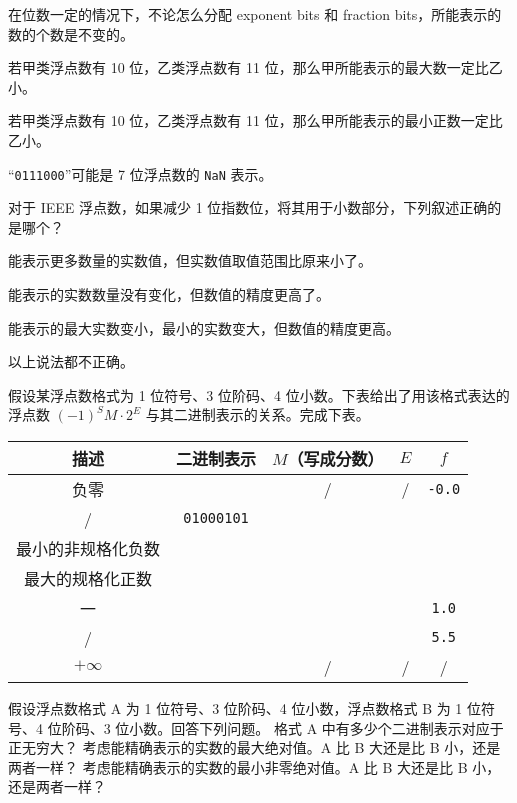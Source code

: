 \begin{problems}
		\begin{choices}
			\item 在位数一定的情况下，不论怎么分配 exponent bits 和 fraction bits，所能表示的数的个数是不变的。
			\item 若甲类浮点数有 10 位，乙类浮点数有 11 位，那么甲所能表示的最大数一定比乙小。
			\item 若甲类浮点数有 10 位，乙类浮点数有 11 位，那么甲所能表示的最小正数一定比乙小。
		    \item “\texttt{0111000}”可能是 7 位浮点数的 \texttt{NaN} 表示。
		\end{choices}
        \pro 对于 IEEE 浮点数，如果减少 1 位指数位，将其用于小数部分，下列叙述正确的是哪个？
		\begin{choices}
			\item 能表示更多数量的实数值，但实数值取值范围比原来小了。
			\item 能表示的实数数量没有变化，但数值的精度更高了。
			\item 能表示的最大实数变小，最小的实数变大，但数值的精度更高。
			\item 以上说法都不正确。
        \end{choices}
		\pro 假设某浮点数格式为 1 位符号、3 位阶码、4 位小数。下表给出了用该格式表达的浮点数 $(-1)^SM \cdot 2^E$ 与其二进制表示的关系。完成下表。
		\begin{table}[H]
			\centering
			\begin{tabular}{|c|c|c|c|c|}
				\hline
				描述 & 二进制表示 & $M$（写成分数） & $E$ & $f$ \\ \hline
				负零 &  & / & / & \texttt{-0.0} \\ \hline
				/ & \verb|01000101| &  &  &  \\ \hline
				最小的非规格化负数 &  &  &  &  \\ \hline
				最大的规格化正数 &  &  &  &  \\ \hline
				一 &  &  &  & \texttt{1.0} \\ \hline
				/ &  &  &  & \texttt{5.5} \\ \hline
				$+\infty$ &  & / & / & / \\ \hline
			\end{tabular}
		\end{table}
		\pro 假设浮点数格式 A 为 1 位符号、3 位阶码、4 位小数，浮点数格式 B 为 1 位符号、4 位阶码、3 位小数。回答下列问题。
			\qn 格式 A 中有多少个二进制表示对应于正无穷大？
			\qn 考虑能精确表示的实数的最大绝对值。A 比 B 大还是比 B 小，还是两者一样？
			\qn 考虑能精确表示的实数的最小非零绝对值。A 比 B 大还是比 B 小，还是两者一样？

\end{problems}
